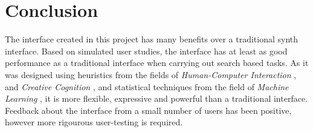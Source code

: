 \documentclass[11pt, oneside]{report}   	%
\begin{document}
%

\chapter{Conclusion}
The interface created in this project has many benefits over a traditional synth interface. Based on simulated user studies, the interface has at least as good performance as a traditional interface when carrying out search based tasks. As it was designed using heuristics from the fields of \emph{Human-Computer Interaction} \cite{MappingStrategies, YeeKing, RatingRanking}, and \emph{Creative Cognition} \cite{TubbThesis}, and statistical techniques from the field of \emph{Machine Learning} \cite{PCA, PreferenceGallery}, it is more flexible, expressive and powerful than a traditional interface. Feedback about the interface from a small number of users has been positive, however more rigourous user-testing is required.
\end{document}
